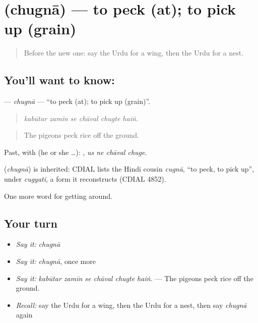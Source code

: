 \section[\texorpdfstring{\ur{چگنا} (chugnā)}{چگنا (chugnā)}]{ (chugnā) — to peck (at); to pick up (grain)}

\label{lesson:UR-C438-chugna}



\begin{quote}
Before the new one: say the Urdu for a wing, then the Urdu for a nest.
\end{quote}

\subsection*{You'll want to know: }
\textbf{} — \emph{chugnā} — \textquotedblleft{}to peck (at); to pick up (grain)\textquotedblright{}.

\begin{quote}
     
\end{quote}

\begin{quote}
\emph{kabūtar zamīn se chāval chugte haiṅ.}
\end{quote}

\begin{quote}
The pigeons peck rice off the ground.
\end{quote}

Past, with  (he or she …):    , \emph{us ne chāval chuge}.

\begin{cousinweb}
\textbf{} (\emph{chugnā}) is inherited: CDIAL lists the Hindi cousin \emph{cugnā}, \textquotedblleft{}to peck, to pick up\textquotedblright{}, under \emph{cugyati}, a form it reconstructs (CDIAL 4852).
\end{cousinweb}

\begin{grammarlens}[title={What you've built}]
One more word for getting around.
\end{grammarlens}

\subsection*{Your turn}
\begin{itemize}
\raggedright
  \item \emph{Say it:} \emph{chugnā}
  \item \emph{Say it:} \emph{chugnā}, once more
  \item \emph{Say it:} \emph{kabūtar zamīn se chāval chugte haiṅ.} — The pigeons peck rice off the ground.
  \item \emph{Recall:} say the Urdu for a wing, then the Urdu for a nest, then say \emph{chugnā} again
\end{itemize}

